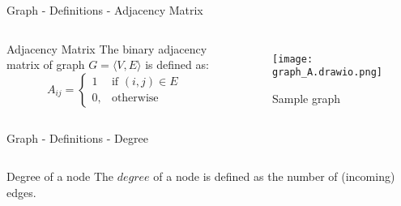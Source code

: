 \begin{frame}{Graph - Definitions - Adjacency Matrix}
  \pause
  \begin{columns}

  \begin{block}{Adjacency Matrix}
    The binary adjacency matrix of graph $G = \langle V, E \rangle$ is defined as:
  \begin{equation}
      \label{eg:AdjacencyMatrix}
      A_{ij} =    
      \begin{cases}
          1  & \text{if } (i, j) \in E \\
          0, & \text{otherwise}
      \end{cases}
  \end{equation}
  \end{block}

  \pause
  
  \begin{figure}
    \centering
    \texttt{[image: graph\_A.drawio.png]}
    \caption{Sample graph}        
  \end{figure}

\end{columns}

\end{frame}

\begin{frame}{Graph - Definitions - Degree}
  \pause
  \begin{columns}
  
    \begin{block}{Degree of a node}
      The $degree$ of a node is defined as the number of (incoming) edges.
    \end{block}


    
  \end{columns}
  \end{frame}

